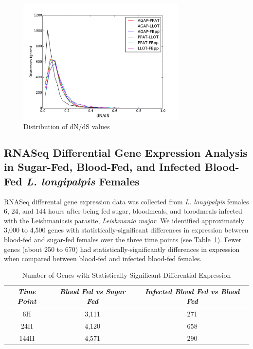 \begin{figure}[H]
  \centering
  \includegraphics[width=0.75\textwidth]{figures/ka_ks/dN_dS}
  \caption{Distribution of dN/dS values}
  \label{fig:dnds-distr}
\end{figure}

\subsection{RNASeq Differential Gene Expression Analysis in Sugar-Fed, Blood-Fed, and Infected Blood-Fed \emph{L. longipalpis} Females}
RNASeq differental gene expression data was collected from \emph{L. longipalpis} females 6, 24, and 144 hours after being fed sugar, bloodmeals, and bloodmeals infected with the Leishmaniasis parasite, \emph{Leishmania major}.  We identified approximately 3,000 to 4,500 genes with statistically-significant differences in expression between blood-fed and sugar-fed females over the three time points (see Table~\ref{tab:stat-sig-genes}).  Fewer genes (about 250 to 670) had statistically-significantly differences in expression when compared between blood-fed and infected blood-fed females.

\begin{table}[H]
  \centering
  \begin{tabular}{c c c} \hline
  \emph{Time Point} & \emph{Blood Fed vs Sugar Fed} & \emph{Infected Blood Fed vs Blood Fed} \\ \hline
  6H & 3,111 & 271 \\ \hline
  24H & 4,120 & 658 \\ \hline
  144H & 4,571 & 290 \\ \hline
  \end{tabular}
  \caption{Number of Genes with Statistically-Significant Differential Expression}
  \label{tab:stat-sig-genes}
\end{table}

